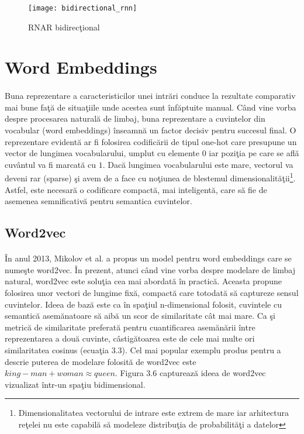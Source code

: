 \begin{figure}[H]
\centering
\texttt{[image: bidirectional\_rnn]}
\caption{RNAR bidirec\c tional}
\end{figure} 

\section{Word Embeddings}

\paragraph{}
Buna reprezentare a caracteristicilor unei intr\u ari conduce la rezultate comparativ mai bune fa\c t\u a de situa\c tiile unde acestea sunt \^ inf\u aptuite manual. C\^ and vine vorba despre procesarea natural\u a de limbaj, buna reprezentare a cuvintelor din vocabular (word embeddings) \^ inseamn\u a un factor decisiv pentru succesul final. O reprezentare evident\u a ar fi folosirea codific\u arii de tipul one-hot care presupune un vector de lungimea vocabularului, umplut cu elemente \(0\) iar pozi\c tia pe care se afl\u a cuv\^ antul va fi marcat\u a cu \(1\). Dac\u a lungimea vocabularului este mare, vectorul va deveni rar (sparse) \c si avem de a face cu no\c tiunea de blestemul dimensionalit\u a\c tii\footnote{Dimensionalitatea vectorului de intrare este extrem de mare iar arhitectura re\c telei nu este capabil\u a s\u a modeleze distribu\c tia de probabilit\u a\c ti a datelor}. Astfel, este necesar\u a o codificare compact\u a, mai inteligent\u a, care s\u a fie de asemenea semnificativ\u a pentru semantica cuvintelor.

\subsection{Word2vec}

\paragraph{}
\^ In anul 2013, Mikolov et al. a propus un model pentru word embeddings care se nume\c ste word2vec. \^ In prezent, atunci c\^ and vine vorba despre modelare de limbaj natural, word2vec este solu\c tia cea mai abordat\u a \^ in practic\u a. Aceasta propune folosirea unor vectori de lungime fix\u a, compact\u a care totodat\u a s\u a captureze sensul cuvintelor. Ideea de baz\u a este ca \^ in spa\c tiul n-dimensional folosit, cuvintele cu semantic\u a asem\u anatoare s\u a aib\u a un scor de similaritate c\^at mai mare. Ca \c si metric\u a de similaritate preferat\u a pentru cuantificarea asem\u an\u arii \^ intre reprezentarea a dou\u a cuvinte, c\^ astig\u atoarea este de cele mai multe ori similaritatea cosinus (ecua\c tia 3.3). Cel mai popular exemplu produs pentru a descrie puterea de modelare folosit\u a de word2vec este \(king - man + woman \approx queen\). Figura 3.6 captureaz\u a ideea de word2vec vizualizat \^ intr-un spa\c tiu bidimensional.

